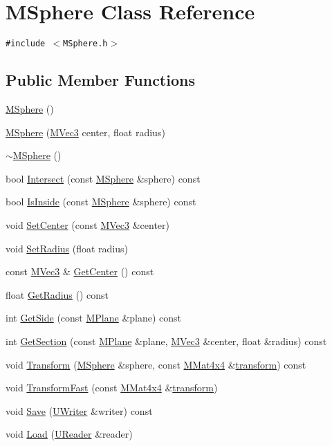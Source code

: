 \hypertarget{class_m_sphere}{
\section{MSphere Class Reference}
\label{class_m_sphere}
}
{\tt \#include $<$MSphere.h$>$}

\subsection*{Public Member Functions}
\begin{CompactItemize}
\item 
\hyperlink{class_m_sphere_0027be61e6778e87d461fa9c9cc12edb}{MSphere} ()
\item 
\hyperlink{class_m_sphere_1a1b2f1118f6abde66f918cda8c5a7ae}{MSphere} (\hyperlink{class_m_vec3}{MVec3} center, float radius)
\item 
\hyperlink{class_m_sphere_adb549c6f1620d450c050419ccefde72}{$\sim$MSphere} ()
\item 
bool \hyperlink{class_m_sphere_8f679796320925dec13f0f8a977e82a6}{Intersect} (const \hyperlink{class_m_sphere}{MSphere} \&sphere) const 
\item 
bool \hyperlink{class_m_sphere_8fffb948b9e22055e9bf8ddd267c9715}{IsInside} (const \hyperlink{class_m_sphere}{MSphere} \&sphere) const 
\item 
void \hyperlink{class_m_sphere_b511291f81201151624da739876a1284}{SetCenter} (const \hyperlink{class_m_vec3}{MVec3} \&center)
\item 
void \hyperlink{class_m_sphere_94cc442a90bbb4f5d4f3e8e9036cef71}{SetRadius} (float radius)
\item 
const \hyperlink{class_m_vec3}{MVec3} \& \hyperlink{class_m_sphere_64551ac188c0149a539f608203060ce0}{GetCenter} () const 
\item 
float \hyperlink{class_m_sphere_27475e1f9a0478b1b6140f103c0fa6fe}{GetRadius} () const 
\item 
int \hyperlink{class_m_sphere_b1fd0e60e8b9ded560953ed82d0b8f19}{GetSide} (const \hyperlink{class_m_plane}{MPlane} \&plane) const 
\item 
int \hyperlink{class_m_sphere_b8ddb431ece00cac00241f82b0aec876}{GetSection} (const \hyperlink{class_m_plane}{MPlane} \&plane, \hyperlink{class_m_vec3}{MVec3} \&center, float \&radius) const 
\item 
void \hyperlink{class_m_sphere_5fc463a6eeba124194bfd8874055f4d2}{Transform} (\hyperlink{class_m_sphere}{MSphere} \&sphere, const \hyperlink{class_m_mat4x4}{MMat4x4} \&\hyperlink{glext__bak_8h_07993c0d92c1aeeb357ba0495c8b5325}{transform}) const 
\item 
void \hyperlink{class_m_sphere_4e6ca0425808409f63a38cbee06ac92d}{TransformFast} (const \hyperlink{class_m_mat4x4}{MMat4x4} \&\hyperlink{glext__bak_8h_07993c0d92c1aeeb357ba0495c8b5325}{transform})
\item 
void \hyperlink{class_m_sphere_7481f688cff487b8d49d597d73263db8}{Save} (\hyperlink{class_u_writer}{UWriter} \&writer) const 
\item 
void \hyperlink{class_m_sphere_5b22737c077b40775756e2845859c925}{Load} (\hyperlink{class_u_reader}{UReader} \&reader)
\end{CompactItemize}


